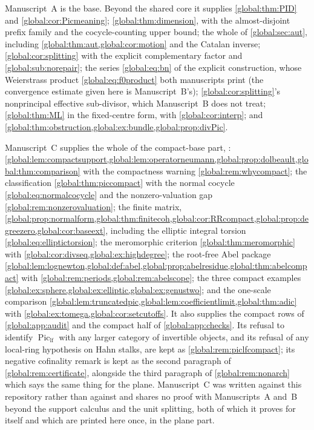 \documentclass[11pt,letterpaper]{article}
\theoremstyle{definition}
\theoremstyle{remark}
\newcommand{\Piclf}{\operatorname{Pic}_{\mathrm{lf}}}
\numberwithin{equation}{section}
\begin{document}
Manuscript~A is the base. Beyond the shared core it supplies \cref{global:thm:PID} and \cref{global:cor:Picmeaning}; \cref{global:thm:dimension}, with the almost-disjoint prefix family and the cocycle-counting upper bound; the whole of \cref{global:sec:aut}, including \cref{global:thm:aut,global:cor:motion} and the Catalan inverse; \cref{global:cor:splitting} with the explicit complementary factor and \cref{global:sub:norepair}; the series \eqref{global:eq:bn} of the explicit construction, whose
Weierstrass product \eqref{global:eq:f0product} both manuscripts print (the
convergence estimate given here is Manuscript~B's);
\cref{global:cor:splitting}'s nonprincipal effective sub-divisor, which
Manuscript~B does not treat; \cref{global:thm:ML} in the fixed-centre form, with \cref{global:cor:interp}; and \cref{global:thm:obstruction,global:ex:bundle,global:prop:divPic}.

Manuscript~C supplies the whole of the compact-base part, : \cref{global:lem:compactsupport,global:lem:operatorneumann,global:prop:dolbeault,global:thm:comparison} with the compactness warning \cref{global:rem:whycompact}; the classification \cref{global:thm:piccompact} with the normal cocycle \eqref{global:eq:normalcocycle} and the nonzero-valuation gap \cref{global:rem:nonzerovaluation}; the finite matrix, \cref{global:prop:normalform,global:thm:finitecoh,global:cor:RRcompact,global:prop:degreezero,global:cor:baseext}, including the elliptic integral torsion \eqref{global:eq:elliptictorsion}; the meromorphic criterion \cref{global:thm:meromorphic} with \cref{global:cor:divseq,global:ex:highdegree}; the root-free Abel package \cref{global:lem:lognewton,global:def:abel,global:prop:abelresidue,global:thm:abelcompact} with \cref{global:rem:periods,global:rem:abelscope}; the three compact examples \cref{global:ex:sphere,global:ex:elliptic,global:ex:genustwo}; and the one-scale comparison \cref{global:lem:truncatedpic,global:lem:coefficientlimit,global:thm:adic} with \cref{global:ex:tomega,global:cor:setcutoffs}. It also supplies the compact rows of \cref{global:app:audit} and the compact half of \cref{global:app:checks}. Its refusal to identify $\Piclf$ with any larger category of invertible objects, and its refusal of any local-ring hypothesis on Hahn stalks, are kept as \cref{global:rem:piclfcompact}; its negative cofinality remark is kept as the second paragraph of \cref{global:rem:certificate}, alongside the third paragraph of \cref{global:rem:nonarch} which says the same thing for the plane. Manuscript~C was written against this repository rather than against \cite{Source} and shares no proof with Manuscripts~A and~B beyond the support calculus and the unit splitting, both of which it proves for itself and which are printed here once, in the plane part.
\end{document}
